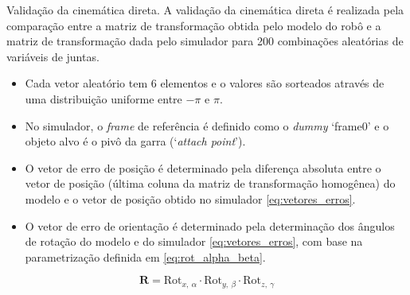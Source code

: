 \documentclass[xcolor=dvipsnames,aspectratio=169]{beamer}
\begin{document}
\begin{frame}{Validação da cinemática direta.}
    \justifying
    A validação da cinemática direta é realizada pela comparação entre a matriz de transformação obtida pelo modelo do robô e a matriz de transformação dada pelo simulador para 200 combinações aleatórias de variáveis de juntas.

    \begin{itemize}
        \item Cada vetor aleatório tem 6 elementos e o valores são sorteados através de uma distribuição uniforme entre \(-\pi\) e \(\pi\).
        \item No simulador, o \textit{frame} de referência é definido como o \textit{dummy} `frame0' e o objeto alvo é o pivô da garra (`\textit{attach point}').
        \item O vetor de erro de posição é determinado pela diferença absoluta entre o vetor de posição (última coluna da matriz de transformação homogênea) do modelo e o vetor de posição obtido no simulador \eqref{eq:vetores_erros}.
        \item O vetor de erro de orientação é determinado pela determinação dos ângulos de rotação do modelo e do simulador \eqref{eq:vetores_erros}, com base na parametrização definida em \eqref{eq:rot_alpha_beta}.
    \end{itemize}


    \begin{equation}
        \mathbf{R} =  \mathrm{Rot}_{x,\ \alpha} \cdot \mathrm{Rot}_{y,\ \beta} \cdot \mathrm{Rot}_{z,\ \gamma}
        \label{eq:rot_alpha_beta}
    \end{equation}
\end{frame}
\end{document}
